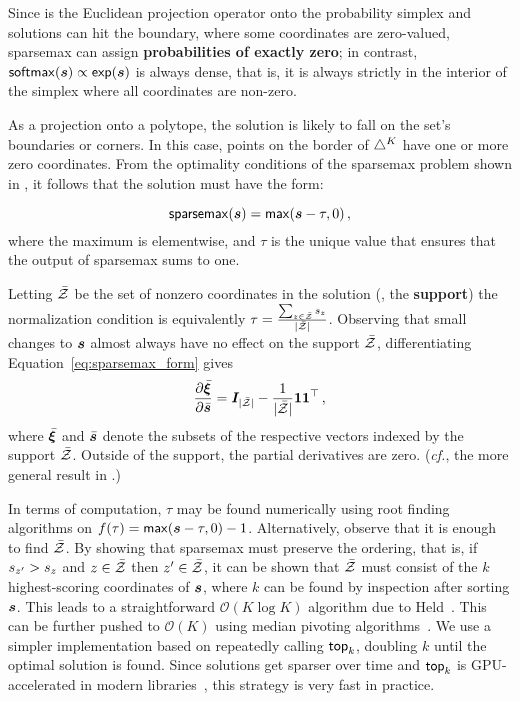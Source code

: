 Since
 is the Euclidean projection operator onto the probability
simplex and solutions can hit the boundary, where some coordinates are zero-valued, sparsemax can assign {\bf
        probabilities of exactly zero}; in contrast, $\softmax(\s)
    \propto \exp(\s)$ is always dense, that is, it is always strictly
in the interior of the simplex where all coordinates are non-zero.

As a projection onto a polytope, the solution is likely to fall on the
set's boundaries or corners. In this case, points on the border of
$\simplex^K$ have one or more zero coordinates.
From the optimality conditions of the sparsemax problem shown in ,
it follows that the solution must have the form:

\newpage

\begin{lemma}
    \begin{equation}\label{eq:sparsemax_form}
        \sparsemax(\s) = \max(\s - \tau, 0)\,,
    \end{equation}
    where the maximum is elementwise, and $\tau$ is the unique value that
    ensures that the output of sparsemax sums to one.
\end{lemma}

Letting $\bar{\ZZ}$ be the set of
nonzero coordinates in the solution (\ie, the \textbf{support}) the
normalization condition is equivalently $\tau = \frac{\sum_{z \in
            \bar{\ZZ}} \ss_z}{|\bar{\ZZ}|}$.
Observing that small changes to $\s$ almost always have no effect on the support
$\bar{\ZZ}$, differentiating Equation~\ref{eq:sparsemax_form} gives
\begin{equation}
    \pfrac{\bar{\pv}}{\bar{\s}} = \bm{I}_{|\bar{\ZZ}|} - \frac{1}{|\bar{\ZZ}|}
    \bm{11}^\top\,,
\end{equation}
where $\bar{\pv}$ and ${\bar{\s}}$ denote the subsets of the respective vectors
indexed by the support $\bar{\ZZ}$. Outside of the support, the partial
derivatives are zero. (\emph{cf.}, the more general result in \citet[Proposition
    2]{entmax}.)

In terms of computation, $\tau$ may be found numerically using root finding
algorithms on $f(\tau) = \max(\s - \tau, 0) - 1$.
Alternatively, observe that it is enough to find $\bar{\ZZ}$. By showing that
sparsemax must preserve the ordering, that is, if $\ss_{z'} > \ss_z$ and $z \in
    \bar{\ZZ}$ then $z' \in \bar{\ZZ}$, it can be shown that $\bar{\ZZ}$ must
consist of the $k$ highest-scoring coordinates of $\s$, where $k$ can be found by
inspection after sorting $\s$. This leads to a straightforward $\mathcal{O}(K
    \log K)$ algorithm due to Held~\citep[pp.~16--17]{Held1974}. This can be further pushed to
$\mathcal{O}(K)$ using median pivoting algorithms~\citep{Condat2016, entmax}. We use
a simpler implementation based on repeatedly calling $\topk$,
doubling $k$ until the optimal solution is found. Since solutions get sparser
over time and $\topk$ is GPU-accelerated
in modern libraries~\citep{pytorch}, this strategy is very fast in practice.

